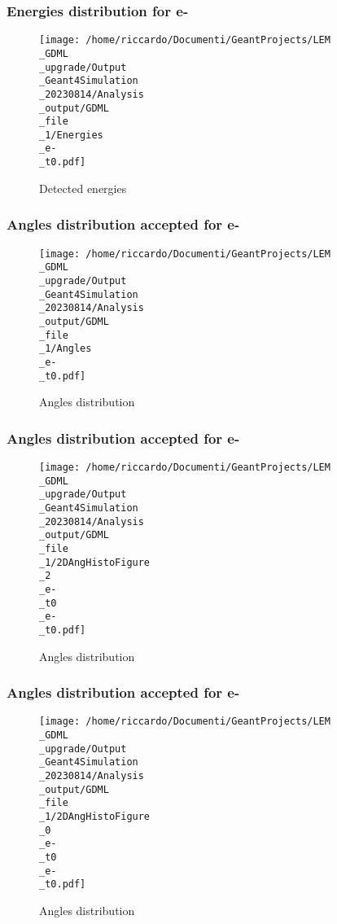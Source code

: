 \documentclass[8pt]{beamer}
\begin{document}
            \begin{frame}
                \frametitle{Energies distribution for e-}
            
        \begin{figure}[h]
            \centering
            \texttt{[image: /home/riccardo/Documenti/GeantProjects/LEM\\\_GDML\\\_upgrade/Output\\\_Geant4Simulation\\\_20230814/Analysis\\\_output/GDML\\\_file\\\_1/Energies\\\_e-\\\_t0.pdf]}
            \caption{Detected energies}
        \end{figure}
        
            \end{frame}
            
            \begin{frame}
                \frametitle{Angles distribution accepted for e-}
            
        \begin{figure}[h]
            \centering
            \texttt{[image: /home/riccardo/Documenti/GeantProjects/LEM\\\_GDML\\\_upgrade/Output\\\_Geant4Simulation\\\_20230814/Analysis\\\_output/GDML\\\_file\\\_1/Angles\\\_e-\\\_t0.pdf]}
            \caption{Angles distribution}
        \end{figure}
        
            \end{frame}
            
            \begin{frame}
                \frametitle{Angles distribution accepted for e-}
            
        \begin{figure}[h]
            \centering
            \texttt{[image: /home/riccardo/Documenti/GeantProjects/LEM\\\_GDML\\\_upgrade/Output\\\_Geant4Simulation\\\_20230814/Analysis\\\_output/GDML\\\_file\\\_1/2DAngHistoFigure\\\_2\\\_e-\\\_t0\\\_e-\\\_t0.pdf]}
            \caption{Angles distribution}
        \end{figure}
        
            \end{frame}
            
            \begin{frame}
                \frametitle{Angles distribution accepted for e-}
            
        \begin{figure}[h]
            \centering
            \texttt{[image: /home/riccardo/Documenti/GeantProjects/LEM\\\_GDML\\\_upgrade/Output\\\_Geant4Simulation\\\_20230814/Analysis\\\_output/GDML\\\_file\\\_1/2DAngHistoFigure\\\_0\\\_e-\\\_t0\\\_e-\\\_t0.pdf]}
            \caption{Angles distribution}
        \end{figure}
        
            \end{frame}
            
\end{document}
